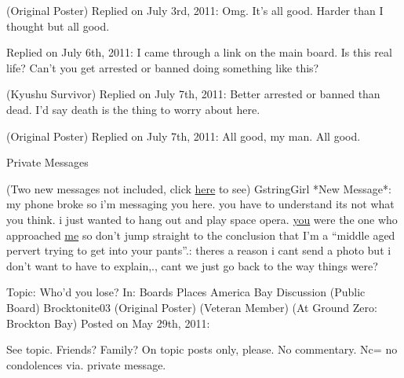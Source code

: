 \blacktriangleright  {}(Original Poster)
Replied on July 3rd, 2011:
Omg.
It's all good.
Harder than I thought but all good.



\blacktriangleright {}
Replied on July 6th, 2011:
I came through a link on the main board.  Is this real life?  Can't you get arrested or banned doing something like this?



\blacktriangleright {} (Kyushu Survivor)
Replied on July 7th, 2011:
Better arrested or banned than dead.  I'd say death is the thing to worry about here.



\blacktriangleright {}(Original Poster)
Replied on July 7th, 2011:
All good, my man.  All good.






\sectionbreak



\blacklozenge  Private Messages



(Two new messages not included, click \underline{here} to see)
GstringGirl *New Message*:  my phone broke so i'm messaging you here. you have to understand its not what you think.  i just wanted to hang out and play space opera. \underline{you} were the one who approached \underline{me} so don't jump straight to the conclusion that I'm a ``middle aged pervert trying to get into your pants''.:  theres a reason i cant send a photo but i don't want to have to explain,.,  cant we just go back to the way things were?\frowny



\sectionbreak



\blacklozenge  Topic:  Who'd you lose?
In:  Boards \blacktriangleright Places \blacktriangleright America \blacktrianglerightBrockton Bay Discussion (Public Board)
Brocktonite03 (Original Poster) (Veteran Member) (At Ground Zero: Brockton Bay)
Posted on May 29th, 2011:



See topic.  Friends?  Family?
On topic posts only, please.  No commentary.  Nc= no condolences via. private message.



